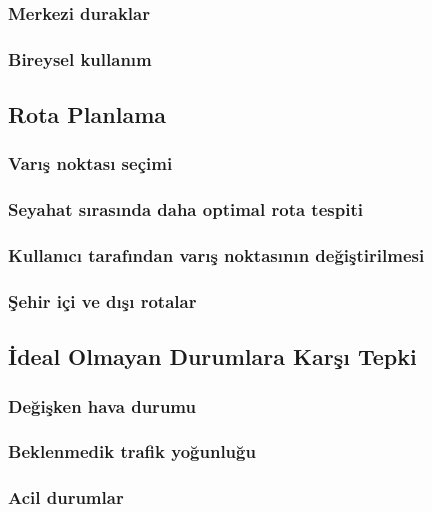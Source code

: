 \subsubsection{Merkezi duraklar}
\subsubsection{Bireysel kullanım}

\subsection{Rota Planlama}

\subsubsection{Varış noktası seçimi}
\subsubsection{Seyahat sırasında daha optimal rota tespiti}
\subsubsection{Kullanıcı tarafından varış noktasının değiştirilmesi}
\subsubsection{Şehir içi ve dışı rotalar}

\subsection{İdeal Olmayan Durumlara Karşı Tepki}

\subsubsection{Değişken hava durumu}
\subsubsection{Beklenmedik trafik yoğunluğu}
\subsubsection{Acil durumlar}

